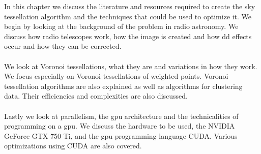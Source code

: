 In this chapter we discuss the literature and resources required to create the sky tessellation algorithm and the techniques that could be used to optimize it. We begin by looking at the background of the problem in radio astronomy. We discuss how radio telescopes work, how the image is created and how \gls{dd} effects occur and how they can be corrected.
\\
\\
We look at Voronoi tessellations, what they are and variations in how they work. We focus especially on Voronoi tessellations of weighted points. Voronoi tessellation algorithms are also explained as well as algorithms for clustering data. Their efficiencies and complexities are also discussed.
\\
\\
Lastly we look at parallelism, the \gls{gpu} architecture and the technicalities of programming on a \gls{gpu}. We discuss the hardware to be used, the NVIDIA GeForce GTX 750 Ti, and the \gls{gpu} programming language CUDA. Various optimizations using CUDA are also covered.
